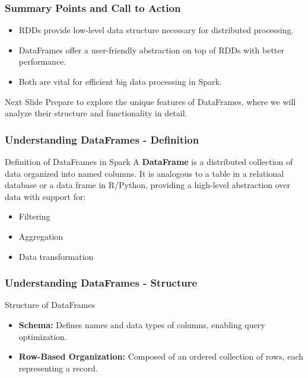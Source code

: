 \documentclass[aspectratio=169]{beamer}
\begin{document}
\begin{frame}[fragile]
    \frametitle{Summary Points and Call to Action}
    \begin{itemize}
        \item RDDs provide low-level data structure necessary for distributed processing.
        \item DataFrames offer a user-friendly abstraction on top of RDDs with better performance.
        \item Both are vital for efficient big data processing in Spark.
    \end{itemize}
    \begin{block}{Next Slide}
        Prepare to explore the unique features of DataFrames, where we will analyze their structure and functionality in detail.
    \end{block}
\end{frame}

\begin{frame}[fragile]
    \frametitle{Understanding DataFrames - Definition}
    \begin{block}{Definition of DataFrames in Spark}
        A \textbf{DataFrame} is a distributed collection of data organized into named columns. It is analogous to a table in a relational database or a data frame in R/Python, providing a high-level abstraction over data with support for:
        \begin{itemize}
            \item Filtering
            \item Aggregation
            \item Data transformation
        \end{itemize}
    \end{block}
\end{frame}

\begin{frame}[fragile]
    \frametitle{Understanding DataFrames - Structure}
    \begin{block}{Structure of DataFrames}
        \begin{itemize}
            \item \textbf{Schema:} Defines names and data types of columns, enabling query optimization.
            \item \textbf{Row-Based Organization:} Composed of an ordered collection of rows, each representing a record.
        \end{itemize}
    \end{block}
\end{frame}
\end{document}

